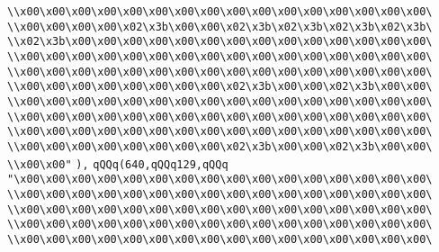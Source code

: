 \verb|\\x00\x00\x00\x00\x00\x00\x00\x00\x00\x00\x00\x00\x00\x00\x00\x00\|\newline
\verb|\\x00\x00\x00\x00\x02\x3b\x00\x00\x02\x3b\x02\x3b\x02\x3b\x02\x3b\|\newline
\verb|\\x02\x3b\x00\x00\x00\x00\x00\x00\x00\x00\x00\x00\x00\x00\x00\x00\|\newline
\verb|\\x00\x00\x00\x00\x00\x00\x00\x00\x00\x00\x00\x00\x00\x00\x00\x00\|\newline
\verb|\\x00\x00\x00\x00\x00\x00\x00\x00\x00\x00\x00\x00\x00\x00\x00\x00\|\newline
\verb|\\x00\x00\x00\x00\x00\x00\x00\x00\x02\x3b\x00\x00\x02\x3b\x00\x00\|\newline
\verb|\\x00\x00\x00\x00\x00\x00\x00\x00\x00\x00\x00\x00\x00\x00\x00\x00\|\newline
\verb|\\x00\x00\x00\x00\x00\x00\x00\x00\x00\x00\x00\x00\x00\x00\x00\x00\|\newline
\verb|\\x00\x00\x00\x00\x00\x00\x00\x00\x00\x00\x00\x00\x00\x00\x00\x00\|\newline
\verb|\\x00\x00\x00\x00\x00\x00\x00\x00\x02\x3b\x00\x00\x02\x3b\x00\x00\|\newline
\verb|\\x00\x00"|\newline
\verb|),|\newline
\verb|qQQq(640,qQQq129,qQQq|\newline
\verb|"\x00\x00\x00\x00\x00\x00\x00\x00\x00\x00\x00\x00\x00\x00\x00\x00\|\newline
\verb|\\x00\x00\x00\x00\x00\x00\x00\x00\x00\x00\x00\x00\x00\x00\x00\x00\|\newline
\verb|\\x00\x00\x00\x00\x00\x00\x00\x00\x00\x00\x00\x00\x00\x00\x00\x00\|\newline
\verb|\\x00\x00\x00\x00\x00\x00\x00\x00\x00\x00\x00\x00\x00\x00\x00\x00\|\newline
\verb|\\x00\x00\x00\x00\x00\x00\x00\x00\x00\x00\x00\x00\x00\x00\x00\x00\|\newline
